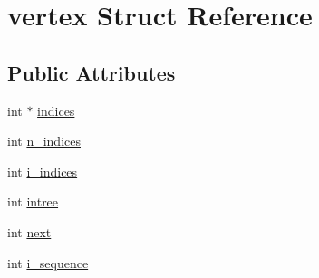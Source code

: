 \hypertarget{structvertex}{\section{vertex Struct Reference}
\label{structvertex}
}
\subsection*{Public Attributes}
\begin{DoxyCompactItemize}
\item 
int $\ast$ \hyperlink{structvertex_a583999f36a31b761343555543e2eefce}{indices}
\item 
int \hyperlink{structvertex_a296df49f6cab00157977d610f7dbae5b}{n\+\_\+indices}
\item 
int \hyperlink{structvertex_a7428afcc864f983bc3f0542657362f30}{i\+\_\+indices}
\item 
int \hyperlink{structvertex_ade015e1a35c3260e139ff7b4e5d4933d}{intree}
\item 
int \hyperlink{structvertex_ac67d53f1ccda0ec85b4870127b6928ad}{next}
\item 
int \hyperlink{structvertex_a1d2a65f07fe0575909c18bf445a7a4c1}{i\+\_\+sequence}
\end{DoxyCompactItemize}


